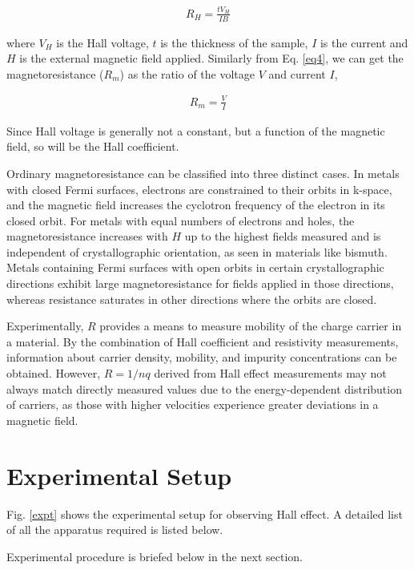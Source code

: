 \begin{align} \label{eq7}
    R_H = \frac{tV_H}{IB}
\end{align}

where $V_H$ is the Hall voltage, $t$ is the thickness of the sample, $I$ is the current and $H$ is the external magnetic field applied. Similarly from Eq. \ref{eq4}, we can get the magnetoresistance ($R_m$) as the ratio of the voltage $V$ and current $I$,

\begin{align} \label{eq8}
    R_m = \frac{V}{I}
\end{align}


Since Hall voltage is generally not a constant, but a function of the magnetic field, so will be the Hall coefficient.

Ordinary magnetoresistance can be classified into three distinct cases. In metals with closed Fermi surfaces, electrons are constrained to their orbits in k-space, and the magnetic field increases the cyclotron frequency of the electron in its closed orbit.
For metals with equal numbers of electrons and
holes, the magnetoresistance increases with $H$ up to the highest fields measured and is independent of crystallographic orientation, as seen in materials like bismuth. Metals containing Fermi surfaces with open orbits in certain crystallographic directions exhibit large magnetoresistance for fields applied in those directions, whereas resistance saturates in other directions where the orbits are closed.

Experimentally, $R$ provides a means to measure mobility of the charge carrier in a material. By the combination of Hall coefficient and resistivity measurements, information about carrier density, mobility, and impurity concentrations can be obtained. However, $R = 1/nq$ derived from Hall effect measurements may not always match directly measured values
due to the energy-dependent distribution of carriers, as
those with higher velocities experience greater deviations
in a magnetic field.

\section{Experimental Setup}
Fig. \ref{expt} shows the experimental setup for observing Hall effect. A detailed list of all the apparatus required is listed below.

Experimental procedure is briefed below in the next section.

